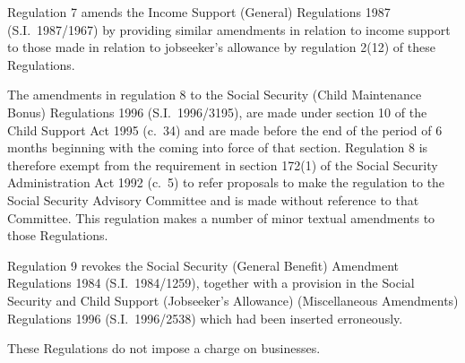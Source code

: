 \documentclass[12pt,a4paper]{article}
\begin{document}
Regulation 7 amends the Income Support (General) Regulations 1987 (S.I.\ 1987/1967) by providing similar amendments in relation to income support to those made in relation to jobseeker’s allowance by regulation 2(12) of these Regulations.

The amendments in regulation 8 to the Social Security (Child Maintenance Bonus) Regulations 1996 (S.I.\ 1996/3195), are made under section 10 of the Child Support Act 1995 (c.\ 34) and are made before the end of the period of 6 months beginning with the coming into force of that section. Regulation 8 is therefore exempt from the requirement in section 172(1) of the Social Security Administration Act 1992 (c.\ 5) to refer proposals to make the regulation to the Social Security Advisory Committee and is made without reference to that Committee. This regulation makes a number of minor textual amendments to those Regulations.

Regulation 9 revokes the Social Security (General Benefit) Amendment Regulations 1984 (S.I.\ 1984/1259), together with a provision in the Social Security and Child Support (Jobseeker’s Allowance) (Miscellaneous Amendments) Regulations 1996 (S.I.\ 1996/2538) which had been inserted erroneously.

These Regulations do not impose a charge on businesses. 
\end{document}
